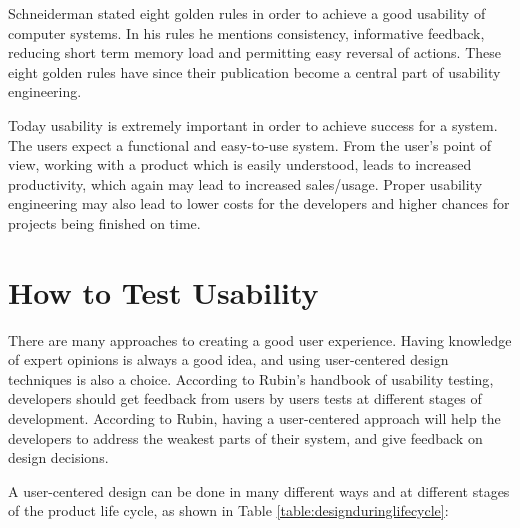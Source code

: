 Schneiderman stated eight golden rules in order to achieve a good usability of computer systems\cite{shneiderman2003designing}. In his rules he mentions consistency, informative feedback, reducing short term memory load and permitting easy reversal of actions. These eight golden rules have since their publication become a central part of usability engineering.

Today usability is extremely important in order to achieve success for a system. The users expect a functional and easy-to-use system. From the user's point of view, working with a product which is easily understood, leads to increased productivity, which again may lead to increased sales/usage\cite{folmer2004architecting}. Proper usability engineering may also lead to lower costs for the developers and higher chances for projects being finished on time\cite{nielsen1994usability}. 


\section{How to Test Usability}
\label{sec:howtotestusability}
There are many approaches to creating a good user experience. Having knowledge of expert opinions is always a good idea, and using user-centered design techniques is also a choice. According to Rubin's handbook of usability testing\cite{rubin2008handbook}, developers should get feedback from users by users tests at different stages of development. According to Rubin, having a user-centered approach will help the developers to address the weakest parts of their system, and give feedback on design decisions. 

A user-centered design can be done in many different ways and at different stages of the product life cycle\cite{abrasusercentereddesign}, as shown in Table \ref{table:designduringlifecycle}:

